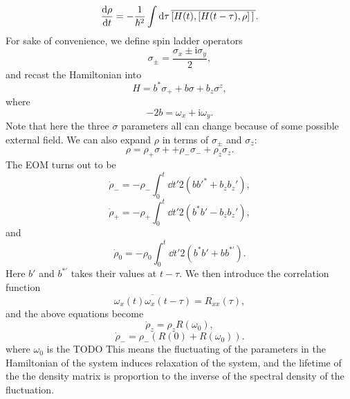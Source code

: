 \documentclass[hyperref, a4paper]{article}
\newcommand*{\ii}{\mathrm{i}}
\begin{document}
\begin{equation}
    \dv{\rho}{t} = - \frac{1}{\hbar^2} \int \dd{\tau}
    \overline{
        \comm*{H(t)}{\comm*{H(t - \tau)}{\rho}}
    }.
\end{equation}
For sake of convenience, 
we define spin ladder operators 
\begin{equation}
    \sigma_{\pm} = \frac{\sigma_x \pm \ii \sigma_y}{2},
\end{equation}
and recast the Hamiltonian into  
\begin{equation}
    H = b^* \sigma_+ + b \sigma + b_z \sigma^z, 
\end{equation}
where 
\begin{equation}
    - 2 b = \omega_x + \ii \omega_y.
\end{equation}
Note that here the three $\sigma$ parameters all can change
because of some possible external field.
We can also expand $\rho$ in terms of $\sigma_\pm$ and $\sigma_z$: 
\begin{equation}
    \rho = \rho_+ \sigma+ + \rho_- \sigma_- + \rho_z \sigma_z.
\end{equation}
The EOM turns out to be 
\begin{equation}
    \dot{\rho}_- = - \rho_- \int_{0}^{t} \dd{t'} 2 (b b'^* + b_z b_z') , 
\end{equation}
\begin{equation}
    \dot{\rho}_+ = - \rho_+ \int_{0}^{t} \dd{t'} 2 (b^* b' - b_z b_z') , 
\end{equation}
and 
\begin{equation}
    \dot{\rho}_0 = - \rho_0 \int_{0}^{t} \dd{t'} 2 (b^* b' + b b^{*'}).
\end{equation}
Here $b'$ and $b^{*'}$ takes their values at $t - \tau$.
We then introduce the correlation function 
\begin{equation}
    \overline{\omega_x(t) \omega_{x} (t - \tau)} = R_{xx}(\tau),
\end{equation}
and the above equations become 
\begin{equation}
    \dot{\rho}_z = \rho_z R(\omega_0), 
\end{equation}
\begin{equation}
    \dot{\rho}_- = \rho_- (R(0) + R(\omega_0)).
\end{equation}
where $\omega_0$ is the TODO 
This means the fluctuating of the parameters in the Hamiltonian of the system
induces relaxation of the system, 
and the lifetime of the the density matrix is proportion to the inverse of 
the spectral density of the fluctuation. 
\end{document}
